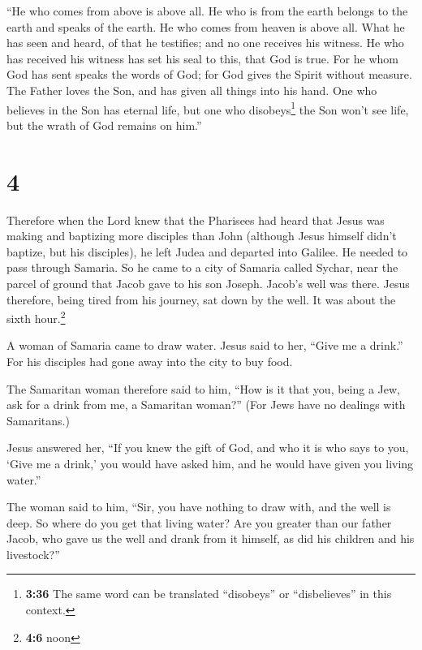  ``He who comes from above is above all. He who is from
the earth belongs to the earth and speaks of the earth. He who comes
from heaven is above all.  What he has seen and heard, of
that he testifies; and no one receives his witness.  He
who has received his witness has set his seal to this, that God is true.
 For he whom God has sent speaks the words of God; for
God gives the Spirit without measure.  The Father loves
the Son, and has given all things into his hand.  One who
believes in the Son has eternal life, but one who disobeys\footnote{\textbf{3:36}
  The same word can be translated ``disobeys'' or ``disbelieves'' in
  this context.} the Son won't see life, but the wrath of God remains on
him.''

\hypertarget{section-3}{%
\section{4}\label{section-3}}

 Therefore when the Lord knew that the Pharisees had heard
that Jesus was making and baptizing more disciples than John
 (although Jesus himself didn't baptize, but his
disciples),  he left Judea and departed into Galilee.
 He needed to pass through Samaria.  So he
came to a city of Samaria called Sychar, near the parcel of ground that
Jacob gave to his son Joseph.  Jacob's well was there.
Jesus therefore, being tired from his journey, sat down by the well. It
was about the sixth hour.\footnote{\textbf{4:6} noon}

 A woman of Samaria came to draw water. Jesus said to her,
``Give me a drink.''  For his disciples had gone away into
the city to buy food.

 The Samaritan woman therefore said to him, ``How is it
that you, being a Jew, ask for a drink from me, a Samaritan woman?''
(For Jews have no dealings with Samaritans.)

 Jesus answered her, ``If you knew the gift of God, and
who it is who says to you, `Give me a drink,' you would have asked him,
and he would have given you living water.''

 The woman said to him, ``Sir, you have nothing to draw
with, and the well is deep. So where do you get that living water?
 Are you greater than our father Jacob, who gave us the
well and drank from it himself, as did his children and his livestock?''

